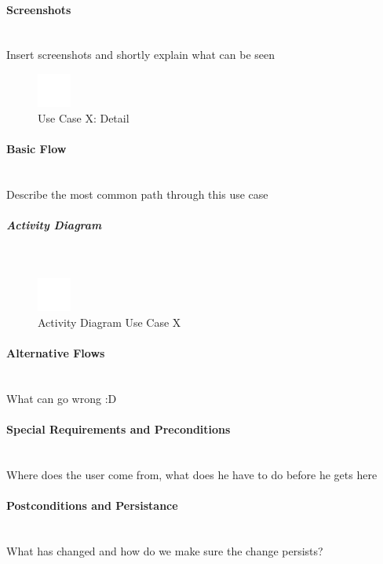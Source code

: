 \paragraph*{Screenshots}\mbox{}\\
Insert screenshots and shortly explain what can be seen
\begin{figure}[h] 
	\centering
	\includegraphics[width=0.1\textwidth]{Content/Domain/placeholder.png}
	\caption{Use Case X: Detail}
	\label{fig:label8}
\end{figure}

\paragraph*{Basic Flow} \mbox{}\\

Describe the most common path through this use case

\subparagraph{Activity Diagram}\mbox{}\\
\begin{figure}[h]
	\centering
	\includegraphics[width=0.1\textwidth]{Content/Domain/placeholder.png}
	\caption{Activity Diagram Use Case X}
	\label{fig:label88}
\end{figure}

\paragraph*{Alternative Flows}\mbox{}\\
What can go wrong :D

\paragraph*{Special Requirements and Preconditions}\mbox{}\\
Where does the user come from, what does he have to do before he gets here

\paragraph*{Postconditions and Persistance}\mbox{}\\
What has changed and how do we make sure the change persists?



